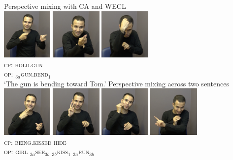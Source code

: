 \documentclass[
  english,
  doc,mask]{apa6}
\begin{document}
\newpage
\begin{exe}
\ex 
\begin{xlist}
\ex Perspective mixing with CA and WECL \\\glll
\includegraphics[width=2.5cm]{pictures/5a_1.png} \includegraphics[width=2.5cm]{pictures/5a_2.png} \includegraphics[width=2.5cm]{pictures/5a_3.png}\\ {\textsc{cp: hold.gun}} \\ \textsc{op:} {\textsc{ }} {\textsc{$_{3a}$gun.bend$_1$}} \\
\glt `The gun is bending toward Tom.'
\ex Perspective mixing across two sentences \\\glll 
\includegraphics[width=2.5cm]{pictures/5b_1.png} \includegraphics[width=2.5cm]{pictures/5b_3.png} \includegraphics[width=2.5cm]{pictures/5b_2.png} \includegraphics[width=2.5cm]{pictures/5b_4.png}\\ \textsc{cp:} {\textsc{}} {\textsc{being.kissed}} {\textsc{hide}} \\ {\textsc{op: girl}} {\textsc{$_{3a}$see$_{3b}$}} {\textsc{$_{3b}$kiss$_1$}} {\textsc{$_{3a}$run$_{3b}$}} \\

\end{xlist}
\end{exe}
\end{document}
